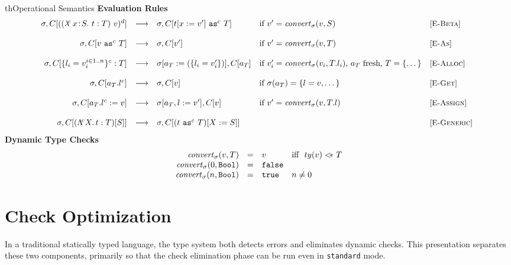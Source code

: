 \documentclass{article}
\newcommand{\myclearpage}{}
\renewcommand{\myclearpage}{\clearpage}
\newcommand{\fun}[1]{\mbox{\it #1\/}}
\newcommand{\lam}[5]{\lambda\!^{#1}\,#2\!:\!#3.\,\,#5:#4}
\newcommand{\app}[3]{(#2~#3)^{#1}}
\newcommand{\Bool}{\t{Bool}}
\newcommand{\true}{\t{true}}
\newcommand{\false}{\t{false}}
\newcommand{\Lam}[4]{\Lambda\!^{#1} #2.\,#3:#4}
\newcommand{\App}[2]{#1[#2]}
\newcommand{\cast}[3]{#2~\t{as}^{#1}~#3}
\newcommand{\comsubtype}[2]{#1 <\!\!\leadsto #2}
\renewcommand{\comsubtype}[2]{#1 <\!\!\!*\,\, #2}
\newcommand{\convert}[2]{{#1}\convertword{#2}}
\newcommand{\convertword}{\mbox{\,\,$\sim :$\,\,}}
\renewcommand{\t}[1]{{\tt #1}}
\newcommand{\red}[0]{\longrightarrow}  %
\newcommand{\lred}[0]{\red}  %
\newcommand{\objty}[1]{\{#1\}}
\newcommand{\obje}[3]{\{#2\}^{#1}:{#3}}
\newcommand{\objv}[1]{\{#1\}}
\newcommand{\objget}[3]{#2.#3^{#1}}
\newcommand{\objset}[4]{#2.#3^{#1}:=#4}
\newcommand{\allocty}[1]{ty(#1)}
\renewcommand{\convert}[2]{\fun{convert}_{\sigma}(#1,#2)}
\newcommand{\istype}[2]{#1~\t{is}_{\sigma}~ #2}
\begin{document}
\begin{displayfigure}{th}{Operational Semantics}
\label{fig:eval} 
\label{fig:convert} 
\footnotesize
{\bf Evaluation Rules}
\[
\begin{array}{@{}rclll}
	\sigma,C[{\app{d}{(\lam{c}{x}{S}{T}{t})}{v}}]
	&\lred&
	\sigma,C[\cast{c}{t[x:=v']}{T}]
	&\mbox{if $v'=\convert v S$}
	&\rel{E-Beta}
\\~\\
	\sigma,C[\cast{c}{v}{T}]
	&\lred&
	\sigma,C[v']
	&\mbox{if $v'=\convert v T$}
	&\rel{E-As}
\\~\\
	\sigma,C[\obje{c}{l_i=v_i^{i\in 1..n}}{T}]
	&\lred&
	\sigma[a_T:=(\objv{l_i=v'_i})],C[a_T] 
	&\mbox{if $v_i'=\convert{v_i}{T.l_i}$, $a_T$ fresh, $T=\objty{\dots}$}
	&\rel{E-Alloc} 
\\~\\
	\sigma,C[\objget{c}{a_T}{l}]
	&\lred&
	\sigma,C[v]
	&\mbox{if $\sigma(a_T)=\objv{l=v,\dots}$}
	&\rel{E-Get}
\\~\\
	\sigma,C[\objset{c}{a_T}{l}{v}]
	&\lred&
	\sigma[a_T,l:=v'],C[v] 
	&\mbox{if $v'=\convert v {T.l}$}
	&\rel{E-Assign} 
\\~\\
	\sigma,C[{\App{(\Lam c X t T)}{S}}]
	&\lred&
	\sigma,C[(\cast{c}{t}{T})[X:=S]]
	& 
	&\rel{E-Generic}
\end{array}
\]
{\bf Dynamic Type Checks}
\[
\begin{array}{rcll}
	\convert{v}{T} &=& v &\mbox{iff~~}%
	 \mbox{$\comsubtype{\allocty v}{T}$} \\
	\convert{0}{\Bool} &=& \false \\
	\convert{n}{\Bool} &=& \true 	 &n\not=0\\
\end{array}
\]
\end{displayfigure} 

\myclearpage
\section{Check Optimization}
\label{sec:opt}

In a traditional statically typed language, the type system both detects errors and eliminates dynamic checks.
This presentation separates these two components, primarily so that the check elimination phase 
can be run even in   \t{standard} mode.
 
\end{document}
